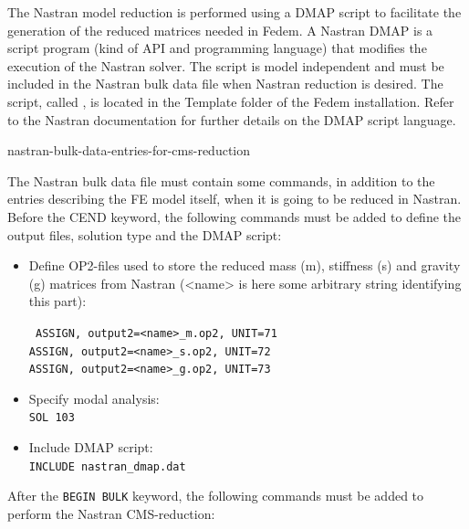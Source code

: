 {The Nastran model reduction is performed using a DMAP script to facilitate the
generation of the reduced matrices needed in Fedem.
A Nastran DMAP is a script program (kind of API and programming language)
that modifies the execution of the Nastran solver. The script is model
independent and must be included in the Nastran bulk data file when Nastran
reduction is desired. The script, called ,
is located in the Template folder of the Fedem installation. Refer to
the Nastran documentation for further details on the DMAP script language.


           {nastran-bulk-data-entries-for-cms-reduction}

The Nastran bulk data file must contain some commands, in addition to
the entries describing the FE model itself, when it is going to be
reduced in Nastran. Before the CEND keyword, the following commands must
be added to define the output files, solution type and the DMAP script:

\begin{itemize}
\item
  Define OP2-files used to store the reduced mass (m), stiffness (s) and
  gravity (g) matrices from Nastran (\textless name\textgreater{} is
  here some arbitrary string identifying this part):

  \texttt{%
    ASSIGN, output2=\textquotesingle\textless name\textgreater\_m.op2\textquotesingle, UNIT=71 \\
    ASSIGN, output2=\textquotesingle\textless name\textgreater\_s.op2\textquotesingle, UNIT=72 \\
    ASSIGN, output2=\textquotesingle\textless name\textgreater\_g.op2\textquotesingle, UNIT=73}
\end{itemize}


\begin{itemize}
\item Specify modal analysis: \\
  \texttt{SOL 103}
\item Include DMAP script: \\
  \texttt{INCLUDE \textquotesingle nastran\_dmap.dat\textquotesingle}
\end{itemize}

After the \texttt{BEGIN BULK} keyword, the following commands must be added
to perform the Nastran CMS-reduction:

}
